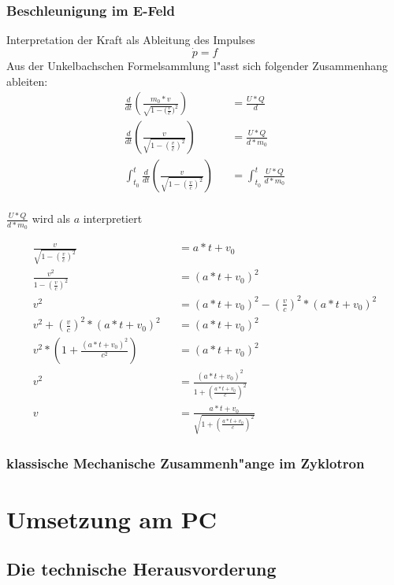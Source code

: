\documentclass[14pt, a4paper]{report}
\begin{document}
\section{Beschleunigung im E-Feld}
Interpretation der Kraft als Ableitung des Impulses
\begin{equation}
\dot{p} = f 
\end{equation}
Aus der Unkelbachschen Formelsammlung l"asst sich folgender Zusammenhang ableiten:
\begin{eqnarray}
\frac{d}{dt} (\frac{m_0 * v}{\sqrt{1 - (\frac{v}{c}})^2}) && = \frac{U * Q}{d} \\
\frac{d}{dt} (\frac{v}{\sqrt{1 - (\frac{v}{c})^2}}) && = \frac{U * Q}{d * m_0} \\
\int_{t_0}^t \frac{d}{dt} (\frac{v}{\sqrt{1 - (\frac{v}{c})^2}}) 
    && = \int_{t_0}^t \frac{U * Q}{d * m_0} \\
\end{eqnarray}
\begin{center}
$ \frac{U * Q}{d * m_0} $ wird als $ a $ interpretiert
\end{center}
\begin{eqnarray}
\frac{v}{\sqrt{1 - (\frac{v}{c})^2}} && = a * t + v_0 \\
\frac{v^2}{1 - (\frac{v}{c})^2} && = (a * t + v_0 )^2 \\
v^2  && = (a * t + v_0)^2 - (\frac{v}{c})^2 * (a * t + v_0)^2\\
v^2 + (\frac{v}{c})^2 * (a * t + v_0)^2 && = (a * t + v_0)^2 \\
v^2 * (1 + \frac{(a * t + v_0)^2}{c^2}) &&  = (a * t + v_0)^2 \\
v^2 && = \frac{(a * t + v_0)^2}{1 + (\frac{a * t + v_0}{c})^2} \\ 
v && = \frac{a * t + v_0}{\sqrt{1 + (\frac{a * t + v_0}{c})^2}}
\end{eqnarray}
\section{klassische Mechanische Zusammenh"ange im Zyklotron}





\part{Umsetzung am PC}
\chapter{Die technische Herausvorderung}
\end{document}
